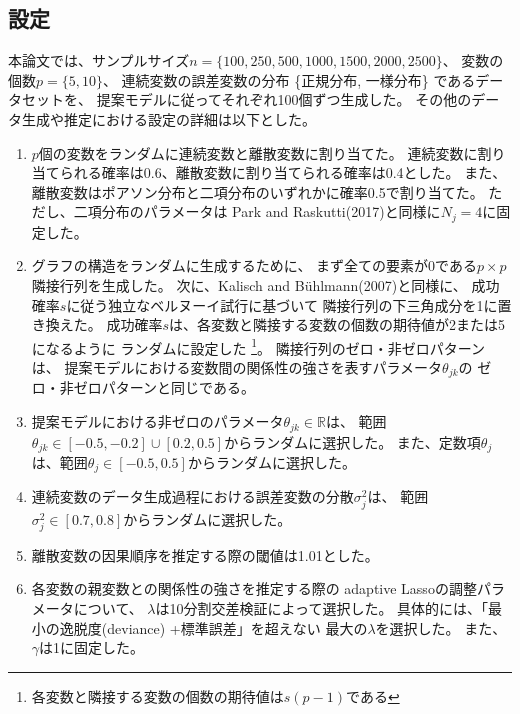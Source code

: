 
\subsection{設定}

本論文では、サンプルサイズ$n = \{ 100, 250, 500, 1000, 1500, 2000, 2500 \}$、
変数の個数$p = \{ 5, 10 \}$、
連続変数の誤差変数の分布 \{正規分布, 一様分布\} であるデータセットを、
提案モデルに従ってそれぞれ100個ずつ生成した。
その他のデータ生成や推定における設定の詳細は以下とした。

\begin{enumerate}
  \setlength{\itemsep}{0.3cm}
  \item
  $p$個の変数をランダムに連続変数と離散変数に割り当てた。
  連続変数に割り当てられる確率は0.6、離散変数に割り当てられる確率は0.4とした。
  また、離散変数はポアソン分布と二項分布のいずれかに確率0.5で割り当てた。
  ただし、二項分布のパラメータは
  Park and Raskutti(2017)\cite{Park2017-hw}と同様に$N_j=4$に固定した。

  \item
  グラフの構造をランダムに生成するために、
  まず全ての要素が0である$p\times p$隣接行列を生成した。
  次に、Kalisch and B\"{u}hlmann(2007)\cite{Kalisch2007-xg}と同様に、
  成功確率$s$に従う独立なベルヌーイ試行に基づいて
  隣接行列の下三角成分を1に置き換えた。
  成功確率$s$は、各変数と隣接する変数の個数の期待値が2または5になるように
  ランダムに設定した
  \footnote{各変数と隣接する変数の個数の期待値は$s(p-1)$である\cite{Kalisch2007-xg}}。
  隣接行列のゼロ・非ゼロパターンは、
  提案モデルにおける変数間の関係性の強さを表すパラメータ$\theta_{jk}$の
  ゼロ・非ゼロパターンと同じである。

  \item
  提案モデルにおける非ゼロのパラメータ$\theta_{jk} \in \mathbb R$は、
  範囲$\theta_{jk} \in [-0.5,-0.2]\cup [0.2,0.5]$からランダムに選択した。
  また、定数項$\theta_j$は、範囲$\theta_j \in [-0.5,0.5]$からランダムに選択した。

  \item
  連続変数のデータ生成過程における誤差変数の分散$\sigma_j^2$は、
  範囲$\sigma_j^2 \in [0.7,0.8]$からランダムに選択した。

  \item
  離散変数の因果順序を推定する際の閾値は1.01とした。

  \item
  各変数の親変数との関係性の強さを推定する際の
  adaptive Lassoの調整パラメータについて、
  $\lambda$は10分割交差検証によって選択した。
  具体的には、「最小の逸脱度(deviance) +標準誤差」を超えない
  最大の$\lambda$を選択した。
  また、$\gamma$は1に固定した。
\end{enumerate}

